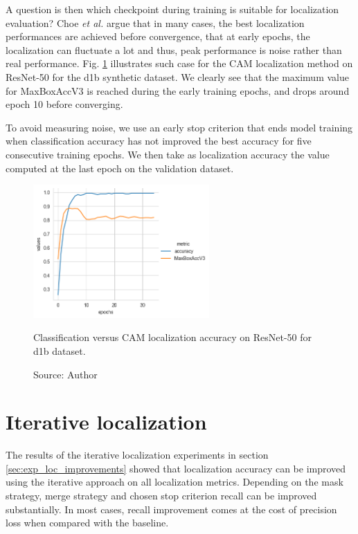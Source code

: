 A question is then which checkpoint during training is suitable for localization evaluation? Choe \textit{et al.} \cite{choe2020evaluating} argue that in many cases, the best localization performances are achieved before convergence, that at early epochs, the localization can fluctuate a lot and thus, peak performance is noise rather than real performance. Fig. \ref{fig:loc_vs_acc_resnet50_cam_d1b} illustrates such case for the CAM localization method on ResNet-50 for the d1b synthetic dataset. We clearly see that the maximum value for MaxBoxAccV3 is reached during the early training epochs, and drops around epoch 10 before converging.

To avoid measuring noise, we use an early stop criterion that ends model training when classification accuracy has not improved the best accuracy for five consecutive training epochs. We then take as localization accuracy the value computed at the last epoch on the validation dataset.

\begin{figure}[ht]
\begin{center}
    \includegraphics[width=0.6\textwidth]{images/fig_loc_vs_acc_resnet50_cam_d1b.png}
    \caption[Classification versus CAM localization accuracy on ResNet-50 for d1b dataset]{Classification versus CAM localization accuracy on ResNet-50 for d1b dataset.}
    \caption*{Source: Author}
    \label{fig:loc_vs_acc_resnet50_cam_d1b}
\end{center}
\end{figure}

\section{Iterative localization}
The results of the iterative localization experiments in section \ref{sec:exp_loc_improvements} showed that localization accuracy can be improved using the iterative approach on all localization metrics. Depending on the mask strategy, merge strategy and chosen stop criterion recall can be improved substantially. In most cases, recall improvement comes at the cost of precision loss when compared with the baseline.

